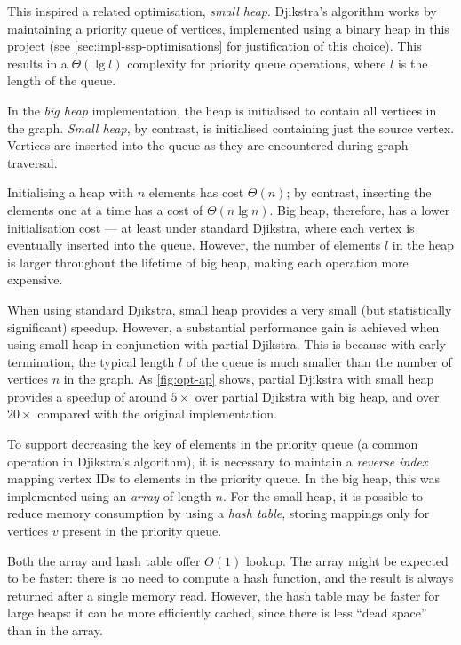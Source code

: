 This inspired a related optimisation, \emph{small heap}. Djikstra's algorithm works by maintaining a priority queue of vertices, implemented using a binary heap in this project (see \cref{sec:impl-ssp-optimisations} for justification of this choice). This results in a $\Theta\left(\lg l\right)$ complexity for priority queue operations, where $l$ is the length of the queue.

In the \emph{big heap} implementation, the heap is initialised to contain all vertices in the graph. \emph{Small heap}, by contrast, is initialised containing just the source vertex. Vertices are inserted into the queue as they are encountered during graph traversal.

Initialising a heap with $n$ elements has cost $\Theta(n)$; by contrast, inserting the elements one at a time has a cost of $\Theta(n\lg n)$. Big heap, therefore, has a lower initialisation cost --- at least under standard Djikstra, where each vertex is eventually inserted into the queue. However, the number of elements $l$ in the heap is larger throughout the lifetime of big heap, making each operation more expensive.

When using standard Djikstra, small heap provides a very small (but statistically significant) speedup. However, a substantial performance gain is achieved when using small heap in conjunction with partial Djikstra. This is because with early termination, the typical length $l$ of the queue is much smaller than the number of vertices $n$ in the graph. As \cref{fig:opt-ap} shows, partial Djikstra with small heap provides a speedup of around $5\times$ over partial Djikstra with big heap, and over $20\times$ compared with the original implementation.

To support decreasing the key of elements in the priority queue (a common operation in Djikstra's algorithm), it is necessary to maintain a \emph{reverse index} mapping vertex IDs to elements in the priority queue. In the big heap, this was implemented using an \emph{array} of length $n$. For the small heap, it is possible to reduce memory consumption by using a \emph{hash table}, storing mappings only for vertices $v$ present in the priority queue.

Both the array and hash table offer $O(1)$ lookup. The array might be expected to be faster: there is no need to compute a hash function, and the result is always returned after a single memory read. However, the hash table may be faster for large heaps: it can be more efficiently cached, since there is less ``dead space'' than in the array.

